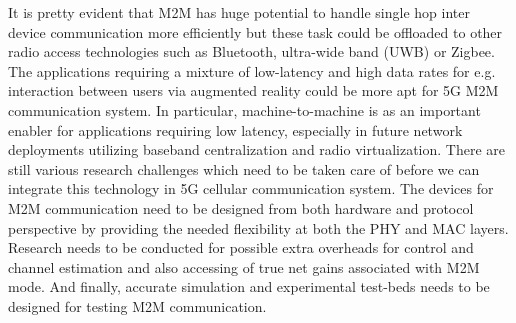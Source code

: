 It is pretty evident that M2M has huge potential to handle single hop inter device communication more efficiently but these task could be offloaded to other radio access technologies such as Bluetooth, ultra-wide band (UWB) or Zigbee. The applications requiring a mixture of low-latency and high data rates for e.g. interaction between users via augmented reality could be more apt for 5G M2M communication system. In particular, machine-to-machine is as an important enabler for applications requiring low latency, especially in future network deployments utilizing baseband centralization and radio virtualization. There are still various research challenges which need to be taken care of before we can integrate this technology in 5G cellular communication system. The devices for M2M communication need to be designed from both hardware and protocol perspective by providing the needed flexibility at both the PHY and MAC layers. Research needs to be conducted for possible extra overheads for control and channel estimation and also accessing of true net gains associated with M2M mode. And finally, accurate simulation and experimental test-beds needs to be designed for testing M2M communication.

